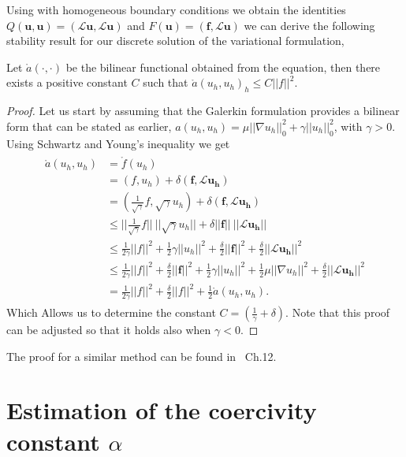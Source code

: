 Using  with homogeneous boundary conditions we obtain the identities $Q(\mathbf{u},\mathbf{u}) = (\mathcal{L}\mathbf{u},\mathcal{L}\mathbf{u})$ and $F(\mathbf{u}) = (\mathbf{f},\mathcal{L}\mathbf{u})$ we can derive the following stability result for our discrete solution of the variational formulation, 
\begin{lemma}
	Let $\mathring{a}(\cdot,\cdot)$ be the bilinear functional obtained from the equation, then there exists a positive constant $C$ such that $\mathring{a}(u_h,u_h)_h \leq C ||f||^2$.
	\label{lemmaStability}
\end{lemma}

\begin{proof}
Let us start by assuming that the Galerkin formulation provides a bilinear form that can be stated as earlier, $a(u_h,u_h)= \mu||\nabla u_h||^2_0 + \gamma||u_h||^2_0$, with $\gamma > 0$. Using Schwartz and Young's inequality we get 
%
\begin{align}
	\begin{split}
	\mathring{a}(u_h,u_h) &= \mathring{f}(u_h) \\
	&= (f,u_h) + \delta(\mathbf{f},\mathcal{L}\mathbf{u_h}) \\
	&= (\frac{1}{\sqrt{\gamma}}f,\sqrt{\gamma}u_h) + \delta(\mathbf{f},\mathcal{L}\mathbf{u_h}) \\
	&\leq ||\frac{1}{\sqrt{\gamma}}f||\:||\sqrt{\gamma}u_h||+\delta||\mathbf{f}||\:||\mathcal{L}\mathbf{u_h}|| \\
	&\leq \frac{1}{2\gamma}||f||^2 + \frac{1}{2}\gamma||u_h||^2 + \frac{\delta}{2}||\mathbf{f}||^2 + \frac{\delta}{2}||\mathcal{L}\mathbf{u_h}||^2 \\
	&\leq \frac{1}{2\gamma}||f||^2 + \frac{\delta}{2}||\mathbf{f}||^2 + \frac{1}{2}\gamma||u_h||^2 + \frac{1}{2}\mu||\nabla u_h||^2 + \frac{\delta}{2}||\mathcal{L}\mathbf{u_h}||^2 \\
	&= \frac{1}{2\gamma}||f||^2 + \frac{\delta}{2}||f||^2 + \frac{1}{2}\mathring{a}(u_h,u_h).
	\end{split}
	\label{eq:derivationStabilityResult}
\end{align}
%
Which Allows us to determine the constant $C= (\frac{1}{\gamma}+\delta)$. Note that this proof can be adjusted so that it holds also when $\gamma <0$.	
\end{proof}
The proof for a similar method can be found in~\cite{Quarteroni} Ch.12. 
\section{Estimation of the coercivity constant $\alpha$}


